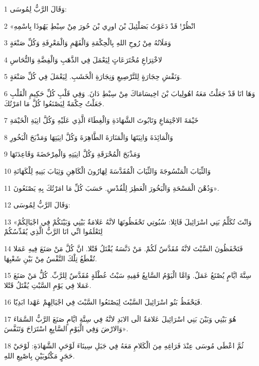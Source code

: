 \par 1 وَقَالَ الرَّبُّ لِمُوسَى:
\par 2 «انْظُرْ! قَدْ دَعَوْتُ بَصَلْئِيلَ بْنَ اورِي بْنَ حُورَ مِنْ سِبْطِ يَهُوذَا بِاسْمِهِ
\par 3 وَمَلَاتُهُ مِنْ رُوحِ اللهِ بِالْحِكْمَةِ وَالْفَهْمِ وَالْمَعْرِفَةِ وَكُلِّ صَنْعَةٍ
\par 4 لاخْتِرَاعِ مُخْتَرَعَاتٍ لِيَعْمَلَ فِي الذَّهَبِ وَالْفِضَّةِ وَالنُّحَاسِ
\par 5 وَنَقْشِ حِجَارَةٍ لِلتَّرْصِيعِ وَنِجَارَةِ الْخَشَبِ. لِيَعْمَلَ فِي كُلِّ صَنْعَةٍ.
\par 6 وَهَا انَا قَدْ جَعَلْتُ مَعَهُ اهُولِيابَ بْنَ اخِيسَامَاكَ مِنْ سِبْطِ دَانَ. وَفِي قَلْبِ كُلِّ حَكِيمِ الْقَلْبِ جَعَلْتُ حِكْمَةً لِيَصْنَعُوا كُلَّ مَا امَرْتُكَ.
\par 7 خَيْمَةَ الاجْتِمَاعِ وَتَابُوتَ الشَّهَادَةِ وَالْغِطَاءَ الَّذِي عَلَيْهِ وَكُلَّ انِيَةِ الْخَيْمَةِ
\par 8 وَالْمَائِدَةَ وَانِيَتَهَا وَالْمَنَارَةَ الطَّاهِرَةَ وَكُلَّ انِيَتِهَا وَمَذْبَحَ الْبَخُورِ
\par 9 وَمَذْبَحَ الْمُحْرَقَةِ وَكُلَّ انِيَتِهِ وَالْمِرْحَضَةَ وَقَاعِدَتَهَا
\par 10 وَالثِّيَابَ الْمَنْسُوجَةَ وَالثِّيَابَ الْمُقَدَّسَةَ لِهَارُونَ الْكَاهِنِ وَثِيَابَ بَنِيهِ لِلْكَهَانَةِ
\par 11 وَدُهْنَ الْمَسْحَةِ وَالْبَخُورَ الْعَطِرَ لِلْقُدْسِ. حَسَبَ كُلِّ مَا امَرْتُكَ بِهِ يَصْنَعُونَ».
\par 12 وَقَالَ الرَّبُّ لِمُوسَى:
\par 13 «وَانْتَ تُكَلِّمُ بَنِي اسْرَائِيلَ قَائِلا: سُبُوتِي تَحْفَظُونَهَا لانَّهُ عَلامَةٌ بَيْنِي وَبَيْنَكُمْ فِي اجْيَالِكُمْ لِتَعْلَمُوا انِّي انَا الرَّبُّ الَّذِي يُقَدِّسُكُمْ
\par 14 فَتَحْفَظُونَ السَّبْتَ لانَّهُ مُقَدَّسٌ لَكُمْ. مَنْ دَنَّسَهُ يُقْتَلُ قَتْلا. انَّ كُلَّ مَنْ صَنَعَ فِيهِ عَمَلا تُقْطَعُ تِلْكَ النَّفْسُ مِنْ بَيْنِ شَعْبِهَا.
\par 15 سِتَّةَ ايَّامٍ يُصْنَعُ عَمَلٌ. وَامَّا الْيَوْمُ السَّابِعُ فَفِيهِ سَبْتُ عُطْلَةٍ مُقَدَّسٌ لِلرَّبِّ. كُلُّ مَنْ صَنَعَ عَمَلا فِي يَوْمِ السَّبْتِ يُقْتَلُ قَتْلا.
\par 16 فَيَحْفَظُ بَنُو اسْرَائِيلَ السَّبْتَ لِيَصْنَعُوا السَّبْتَ فِي اجْيَالِهِمْ عَهْدا ابَدِيّا.
\par 17 هُوَ بَيْنِي وَبَيْنَ بَنِي اسْرَائِيلَ عَلامَةٌ الَى الابَدِ لانَّهُ فِي سِتَّةِ ايَّامٍ صَنَعَ الرَّبُّ السَّمَاءَ وَالارْضَ وَفِي الْيَوْمِ السَّابِعِ اسْتَرَاحَ وَتَنَفَّسَ».
\par 18 ثُمَّ اعْطَى مُوسَى عِنْدَ فَرَاغِهِ مِنَ الْكَلامِ مَعَهُ فِي جَبَلِ سِينَاءَ لَوْحَيِ الشَّهَادَةِ: لَوْحَيْ حَجَرٍ مَكْتُوبَيْنِ بِاصْبِعِ اللهِ.

